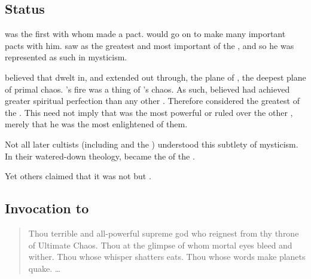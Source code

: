 \subsection{Status}
\RuinSatha was the first \xs with whom \Sethicus made a pact. 
\Sethicus would go on to make many important pacts with him. 
\Sethicus saw \RuinSatha as the greatest and most important of the \xs, and so he was represented as such in \draconian mysticism. 

\Sethicus believed that \RuinSatha dwelt in, and extended out through, the plane of \DaathKurZulNathla, the deepest plane of primal chaos. 
\RuinSatha's fire was a thing of \DaathKurZulNathla's chaos.
As such, \Sethicus believed \RuinSatha had achieved greater spiritual perfection than any other \xs. 
Therefore \Sethicus considered \RuinSatha the greatest of the \xss.
This need not imply that \RuinSatha was the most powerful or ruled over the other \xss, merely that he was the most enlightened of them. 

Not all later cultists (including \dragons and the ) understood this subtlety of \Sethican mysticism. 
In their watered-down theology, \RuinSatha became the  of the \xss.

Yet others claimed that it was not \RuinSatha but . 









\subsection{Invocation to \RuinSatha}
\begin{quotation}
  Thou terrible and all-powerful supreme god who reignest from thy throne of Ultimate Chaos.
  Thou at the glimpse of whom mortal eyes bleed and wither.
  Thou whose whisper shatters eats.
  Thou whose words make planets quake.
  \ldots
\end{quotation}
















